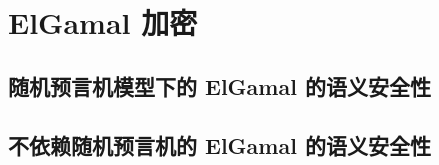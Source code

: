 \section{ElGamal 加密}\label{sec:11-5}

\subsection{随机预言机模型下的 ElGamal 的语义安全性}\label{subsec:11-5-1}

\subsection{不依赖随机预言机的 ElGamal 的语义安全性}\label{subsec:11-5-2}